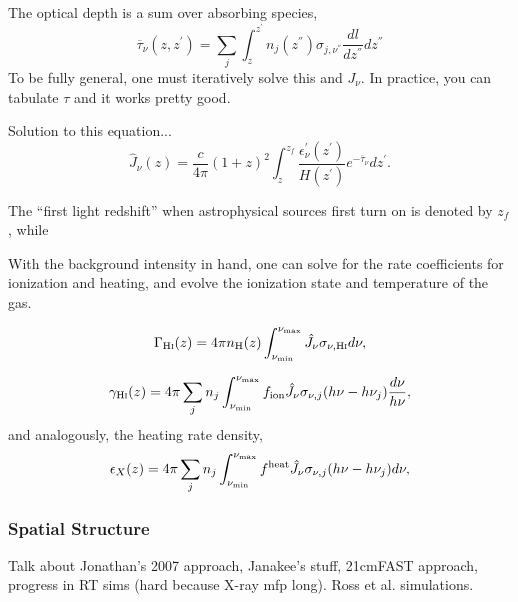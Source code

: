 The optical depth is a sum over absorbing species,
\begin{equation}
    \overline{\tau}_{\nu}(z, z^{\prime}) = \sum_j \int_{z}^{z^{\prime}} n_j(z^{\dprime}) \sigma_{j, \nu^{\dprime}} \frac{dl}{dz^{\dprime}}dz^{\dprime} \label{eq:tau_igm}
\end{equation}
To be fully general, one must iteratively solve this and $J_{\nu}$. In practice, you can tabulate $\tau$ and it works pretty good.


Solution to this equation...
\begin{equation}
    \hat{J}_{\nu} (z) = \frac{c}{4\pi} (1 + z)^2 \int_{z}^{z_f} \frac{\epsilon_{\nu}^{\prime}(z^{\prime})}{H(z^{\prime})} e^{-\overline{\tau}_{\nu}} dz^{\prime} . \label{eq:AngleAveragedFlux}
\end{equation}    

The ``first light redshift'' when astrophysical sources first turn on is denoted by $z_f$, while 



With the background intensity in hand, one can solve for the rate coefficients for ionization and heating, and evolve the ionization state and temperature of the gas.  


\begin{equation}
    \Gamma_{\text{H} {\textsc{i}}}(z) = 4 \pi n_{\text{H}}(z) \int_{\nu_{\min}}^{\nu_{\max}} \hat{J}_{\nu} \sigma_{\nu,\text{H} {\textsc{i}}} d\nu ,
\end{equation}

\begin{equation}
    \gamma_{\text{H} {\textsc{i}}}(z) = 4 \pi \sum_j n_j \int_{\nu_{\min}}^{\nu_{\max}} f_{\text{ion}} \hat{J}_{\nu} \sigma_{\nu,j} (h\nu - h\nu_j) \frac{d\nu}{h\nu} \label{eq:HeatingRateDensity} ,
\end{equation}
and analogously, the heating rate density,
\begin{equation}
    \epsilon_X(z) = 4 \pi \sum_j n_j \int_{\nu_{\min}}^{\nu_{\max}} f^{\text{heat}} \hat{J}_{\nu}  \sigma_{\nu,j} (h\nu - h\nu_j) d\nu \label{eq:HeatingRateDensity} ,
\end{equation}




\subsubsection{Spatial Structure} \label{sec:temperature_global}



Talk about Jonathan's 2007 approach, Janakee's stuff, 21cmFAST approach, progress in RT sims (hard because X-ray mfp long). Ross et al. simulations.



